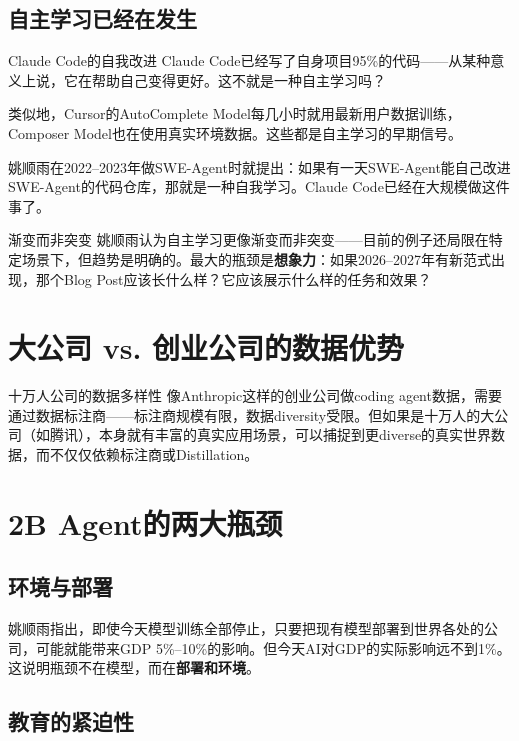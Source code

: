 \documentclass[a4paper]{article}
\begin{document}
\subsection{自主学习已经在发生}

\begin{knowledgebox}{Claude Code的自我改进}
Claude Code已经写了自身项目95\%的代码——从某种意义上说，它在帮助自己变得更好。这不就是一种自主学习吗？

类似地，Cursor的AutoComplete Model每几小时就用最新用户数据训练，Composer Model也在使用真实环境数据。这些都是自主学习的早期信号。
\end{knowledgebox}

姚顺雨在2022--2023年做SWE-Agent时就提出：如果有一天SWE-Agent能自己改进SWE-Agent的代码仓库，那就是一种自我学习。Claude Code已经在大规模做这件事了。

\begin{warningbox}{渐变而非突变}
姚顺雨认为自主学习更像渐变而非突变——目前的例子还局限在特定场景下，但趋势是明确的。最大的瓶颈是\textbf{想象力}：如果2026--2027年有新范式出现，那个Blog Post应该长什么样？它应该展示什么样的任务和效果？
\end{warningbox}


\section{大公司 vs. 创业公司的数据优势}

\begin{knowledgebox}{十万人公司的数据多样性}
像Anthropic这样的创业公司做coding agent数据，需要通过数据标注商——标注商规模有限，数据diversity受限。但如果是十万人的大公司（如腾讯），本身就有丰富的真实应用场景，可以捕捉到更diverse的真实世界数据，而不仅仅依赖标注商或Distillation。
\end{knowledgebox}


\section{2B Agent的两大瓶颈}

\subsection{环境与部署}

姚顺雨指出，即使今天模型训练全部停止，只要把现有模型部署到世界各处的公司，可能就能带来GDP 5\%--10\%的影响。但今天AI对GDP的实际影响远不到1\%。这说明瓶颈不在模型，而在\textbf{部署和环境}。

\subsection{教育的紧迫性}
\end{document}
